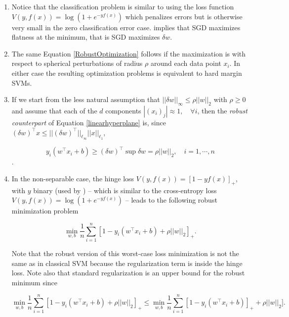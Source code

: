 \documentclass[10pt]{article}
\begin{document}
\begin{enumerate}

\item 
Notice that the classification problem is  similar to using the
loss function $V(y, f(x))=\log(1+ e^{-yf(x)})$ which penalizes errors
but is otherwise very small in the zero classification error
case. \cite{Theory_IIb} implies that SGD maximizes flatness
at the minimum, that is SGD maximizes $\delta w$.

\item The same Equation \ref{RobustOptimization} follows if the
maximization is with respect to spherical perturbations of radius
$\rho$ around each data point $x_i$. In either case the resulting
optimization problems is equivalent to hard margin SVMs.

\item If we
  start from the less natural assumption that $||\delta w||_\infty \leq \rho ||w||_2$ with $\rho \geq
0$ and assume that each of the $d$ components $|(x_i)_j| \approx 1, \quad
\forall
i$, then the {\it robust counterpart} of Equation \ref{linearhyperplane} is,
since $(\delta w)^\intercal x \leq ||(\delta
w)^\intercal||_{\ell_{\infty}} ||x||_{\ell_1}$,


\begin{equation}
y_i(w^\intercal x_i + b) \geq (\delta w)^\intercal \sup \delta w = \rho ||w||_2, \quad i=1, \cdots,n
\label{RobustCounterpart-2}
\end{equation}.


\item In the non-separable case, the hinge loss
  $V(y, f(x))= [1-yf(x)]_+$, with $y$ binary (used by \cite{Xu2009})
  -- which is similar to the cross-entropy loss
  $V(y, f(x))=\log(1+ e^{-yf(x)})$ -- leads to the following robust
minimization problem

\begin{equation}
\min_{w,b}  \frac{1}{n} \sum _{i=1}^n [1-y_i(w^\intercal x_i + b) +\rho ||w||_2]_+.
\label{HingeRobustOptimization}
\end{equation}

Note that the robust version of this worst-case loss minimization is
not the same as in classical SVM because the regularization term is
inside the hinge loss. Note also that standard regularization is an
upper bound for the robust minimum since


\begin{equation}
\min_{w,b}  \frac{1}{n} \sum _{i=1}^n [1-y_i(w^\intercal x_i + b) +\rho
||w||_2]_+ \leq \min_{w,b} \frac{1}{n} \sum _{i=1}^n [1-y_i(w^\intercal x_i +
b)]_+ + \rho ||w||_2].
\label{HingeRobustOptimizationBound}
\end{equation}


\end{enumerate}
\end{document}
